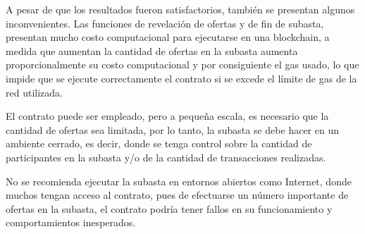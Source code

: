   
      A pesar de que los resultados fueron satisfactorios, también se presentan algunos inconvenientes.
      Las funciones de revelación de ofertas y de fin de subasta, presentan mucho costo computacional para 
      ejecutarse en una blockchain, a medida que aumentan la cantidad de ofertas en la subasta aumenta 
      proporcionalmente 
      su costo computacional y por consiguiente el gas usado, lo que impide que se ejecute correctamente el contrato
      si se excede el límite de gas de la red utilizada.
  
  
      El contrato puede ser empleado, pero a pequeña escala, es necesario que la cantidad de ofertas sea 
      limitada, por lo tanto, la subasta se debe hacer en un ambiente cerrado, es decir, donde se tenga
      control sobre la cantidad de participantes en la subasta y/o de la cantidad de transacciones realizadas.
      
      No se recomienda ejecutar la subasta en entornos abiertos como Internet, donde muchos tengan acceso al
      contrato, pues de efectuarse un número importante de ofertas en la subasta, el contrato podría tener
      fallos en su funcionamiento y comportamientos inesperados.
